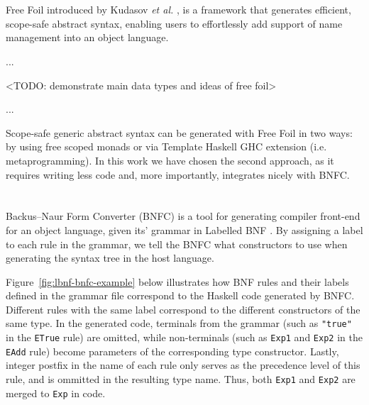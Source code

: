 
\section{}

Free Foil introduced by Kudasov \textit{et al.} \cite{FreeFoil}, is a framework that generates efficient, scope-safe abstract syntax, enabling users to effortlessly add support of name management into an object language.

...

<TODO: demonstrate main data types and ideas of free foil>

...

Scope-safe generic abstract syntax can be generated with Free Foil in two ways: by using free scoped monads or via Template Haskell \cite{SheardPeytonJones2002_TH} GHC extension (i.e. metaprogramming). In this work we have chosen the second approach, as it requires writing less code and, more importantly, integrates nicely with BNFC.


\section{}

Backus–Naur Form Converter (BNFC) \cite{BNFC} is a tool for generating compiler front-end for an object language, given its' grammar in Labelled BNF \cite{BackusNaurForm2003}. By assigning a label to each rule in the grammar, we tell the BNFC what constructors to use when generating the syntax tree in the host language.

Figure~\ref{fig:lbnf-bnfc-example} below illustrates how BNF rules and their labels defined in the grammar file correspond to the Haskell code generated by BNFC. Different rules with the same label correspond to the different constructors of the same type. In the generated code, terminals from the grammar (such as \texttt{"true"} in the \texttt{ETrue} rule) are omitted, while non-terminals (such as \texttt{Exp1} and \texttt{Exp2} in the \texttt{EAdd} rule) become parameters of the corresponding type constructor. Lastly, integer postfix in the name of each rule only serves as the precedence level of this rule, and is ommitted in the resulting type name. Thus, both \texttt{Exp1} and \texttt{Exp2} are merged to \texttt{Exp} in code.

